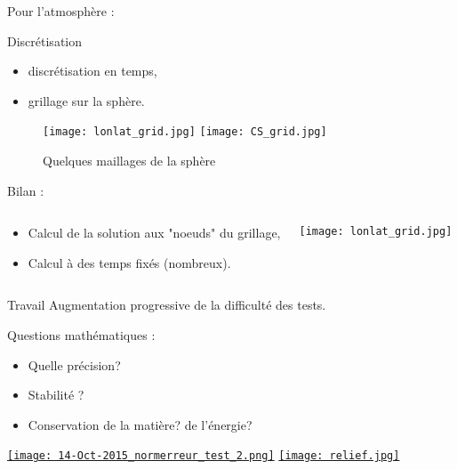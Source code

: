 \documentclass[11pt]{beamer}
\begin{document}
\begin{frame}{Pour l'atmosphère :}

\begin{block}{Discrétisation}
\begin{itemize}
\item discrétisation en temps,
\item grillage sur la sphère.
\end{itemize}
\end{block}

\begin{figure}
\texttt{[image: lonlat\_grid.jpg]} \hspace{1cm}
\texttt{[image: CS\_grid.jpg]}
\caption{Quelques maillages de la sphère}
\end{figure}

\end{frame}

\begin{frame}{Bilan :}
\begin{columns}
\begin{block}{}
\begin{itemize}
\item Calcul de la solution aux "noeuds" du grillage,
\item Calcul à des temps fixés (nombreux).
\end{itemize}
\end{block}

\begin{center}
\texttt{[image: lonlat\_grid.jpg]} 
\end{center}
\end{columns}
\end{frame}

\begin{frame}

\begin{block}{Travail}
Augmentation progressive de la difficulté des tests.
\end{block}

\pause

\begin{block}{Questions mathématiques :}
\begin{itemize}
\item Quelle précision?
\item Stabilité ?
\item Conservation de la matière? de l'énergie?
\end{itemize}
\end{block}

\begin{center}
\href{run:ref_7363145849_test_2.avi}{\texttt{[image: 14-Oct-2015\_normerreur\_test\_2.png]}} 
\href{run:ref_7366568562.avi}{\texttt{[image: relief.jpg]}}
\end{center}

\end{frame}
\end{document}
